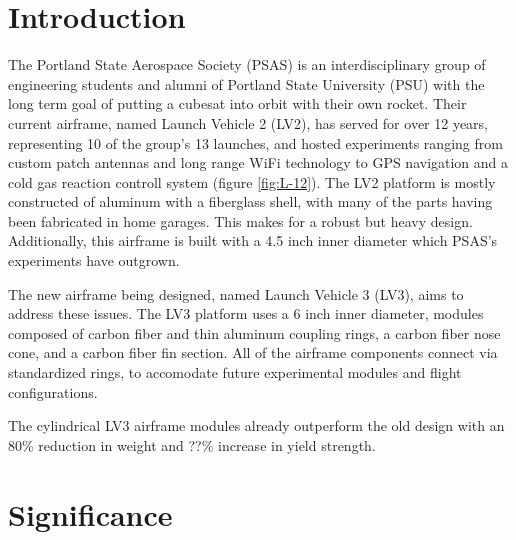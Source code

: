 \documentclass{aiaa-tc}%
\newcommand{\weightReduction}{80\%}
\newcommand{\strengthIncrease}{??\%}
\begin{document}
\section{Introduction}
The Portland State Aerospace Society (PSAS) is an interdisciplinary group of engineering students and alumni of Portland State University (PSU) with the long term goal of putting a cubesat into orbit with their own rocket. 
Their current airframe, named Launch Vehicle 2 (LV2), has served for over 12 years, representing 10 of the group's 13 launches, and hosted experiments ranging from custom patch antennas and long range WiFi technology to GPS navigation and a cold gas reaction controll system (figure \ref{fig:L-12}). The LV2 platform is mostly constructed of aluminum with a fiberglass shell, with many of the parts having been fabricated in home garages. This makes for a robust but heavy design. Additionally, this airframe is built with a 4.5 inch inner diameter which PSAS's experiments have outgrown. 

The new airframe being designed, named Launch Vehicle 3 (LV3), aims to address these issues. The LV3 platform uses a 6 inch inner diameter, modules composed of carbon fiber and thin aluminum coupling rings, a carbon fiber nose cone, and a carbon fiber fin section. All of the airframe components connect via standardized rings, to accomodate future experimental modules and flight configurations.

The cylindrical LV3 airframe modules already outperform the old design with an \weightReduction{} reduction in weight and \strengthIncrease{} increase in yield strength. 
\section{Significance}
\end{document}
